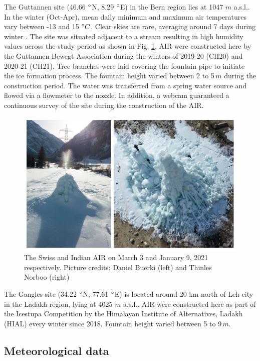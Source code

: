 \documentclass[utf8]{frontiersSCNS} %
\begin{document}
The Guttannen site (46.66 $\degree$N, 8.29 $\degree$E) in the Bern region lies at 1047 $m$ a.s.l.. In the winter
(Oct-Apr), mean daily minimum and maximum air temperatures vary between -13 and 15 $\degree C$. Clear skies are rare,
averaging around 7 days during winter \citep{guttannen}. The site was situated adjacent to a stream resulting in high
humidity values across the study period as shown in Fig. \ref{fig:2AIR}. AIR were constructed here by the Guttannen
Bewegt Association during the winters of 2019-20 (CH20) and 2020-21 (CH21). Tree branches were laid covering the
fountain pipe to initiate the ice formation process. The fountain height varied between 2 to 5\,$m$ during the
construction period. The water was transferred from a spring water source and flowed via a flowmeter to the nozzle. In
addition, a webcam guaranteed a continuous survey of the site during the construction of the AIR.

\begin{figure}
	\begin{center}
		\includegraphics[width=12 cm]{Figures/2AIR.jpg}
	\end{center}
	\caption{The Swiss and Indian AIR on March 3 and January 9, 2021 respectively. Picture credits: Daniel Buerki (left)
		and Thinles Norboo (right)}
	\label{fig:2AIR}
\end{figure}

The Gangles site (34.22 $\degree$N, 77.61 $\degree$E) is located around 20 km north of Leh city in the Ladakh
region, lying at 4025 $m$ a.s.l.. AIR were constructed here as part of the Icestupa Competition  by the Himalayan
Institute of Alternatives, Ladakh (HIAL) every winter since 2018. Fountain height varied between 5 to 9\,$m$.

\subsection{Meteorological data}
\end{document}
